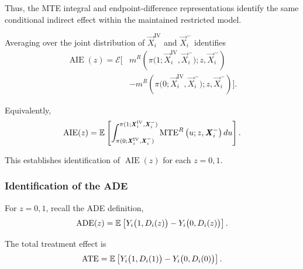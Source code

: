 Thus, the MTE integral and endpoint-difference representations identify the same conditional indirect effect within the maintained restricted model.

Averaging over the joint distribution of $\vec X_i^{\mathrm{IV}}$ and $\vec X_i^-$ identifies
\[
    \begin{aligned}
    \operatorname{AIE}(z)
    =
    \mathcal E
    \Big[
        &
        m^R
        \left(
            \pi
            \big(
                1;
                \vec X_i^{\mathrm{IV}},
                \vec X_i^-
            \big);
            z,
            \vec X_i^-
        \right)
        \\
        &-
        m^R
        \left(
            \pi
            \big(
                0;
                \vec X_i^{\mathrm{IV}},
                \vec X_i^-
            \big);
            z,
            \vec X_i^-
        \right)
    \Big].
    \end{aligned}
    \label{eqn:aie-endpoint-identification}
\]

Equivalently,
\[
    \begin{aligned}
    \operatorname{AIE}(z)
    =
    \mathbb{E}_{} \left[ 
        \int_{
            \pi(
                0;
                \boldsymbol{\mathit{X}}_i^{\mathrm{IV}},
                \boldsymbol{\mathit{X}}_i^-
            )
        }^{
            \pi(
                1;
                \boldsymbol{\mathit{X}}_i^{\mathrm{IV}},
                \boldsymbol{\mathit{X}}_i^-
            )
        }
            \operatorname{MTE}^R
            \big(
                u;
                z,
                \boldsymbol{\mathit{X}}_i^-
            \big)
        \,du  \right].
    \end{aligned}
    \label{eqn:aie-mte-identification}
\]

This establishes identification of $\operatorname{AIE}(z)$ for each $z=0,1$.

\subsubsection{Identification of the ADE}

For $z=0,1$, recall the ADE definition,
\[
    \operatorname{ADE}(z)
    =
    \mathbb{E}_{} \left[ Y_i
        \big(
            1,D_i(z)
        \big)
        -
        Y_i
        \big(
            0,D_i(z)
        \big) \right].
    \label{eqn:ade-t-definition}
\]

The total treatment effect is
\[
    \operatorname{ATE}
    =
    \mathbb{E}_{} \left[ 
        Y_i
        \big(
            1,D_i(1)
        \big)
        -
        Y_i
        \big(
            0,D_i(0)
        \big) \right].
    \label{eqn:ate-nested-definition}
\]

